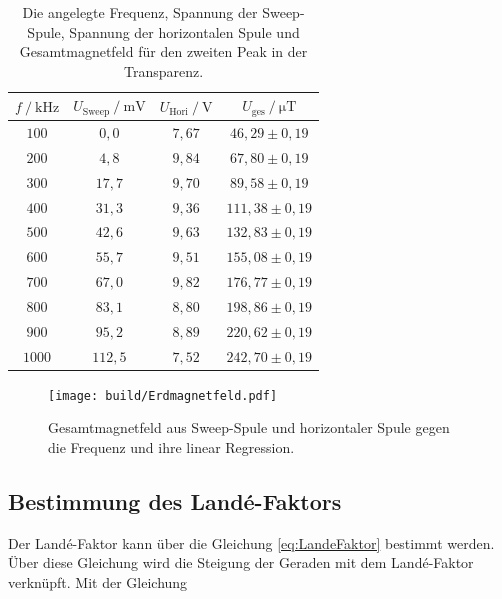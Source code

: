 \begin{table}[H]
    \centering
    \caption{Die angelegte Frequenz, Spannung der Sweep-Spule, Spannung der horizontalen Spule und Gesamtmagnetfeld für den zweiten Peak in der Transparenz.}
    \label{tab:Messung2}
    \begin{tabular}{c c c c}
    \toprule
      $ f \mathbin{/} \unit{\kilo\hertz}$ & $U_{\text{Sweep}} \mathbin{/} \unit{\milli\volt}$ & $U_{\text{Hori}} \mathbin{/} \unit{\volt}$ & $U_{\text{ges}} \mathbin{/} \unit{\micro\tesla}$ \\
    \midrule
        $100$ &     $ 0,0    $    &   $7,67$     &$46,29   \pm 0,19$     \\ 
        $200$ &     $ 4,8  $    &   $9,84$     &$67,80   \pm 0,19$     \\ 
        $300$ &     $ 17,7 $    &   $9,70$     &$89,58   \pm 0,19$    \\ 
        $400$ &     $ 31,3 $    &   $9,36$     &$111,38  \pm 0,19$    \\ 
        $500$ &     $ 42,6 $    &   $9,63$     &$132,83  \pm 0,19$    \\ 
        $600$ &     $ 55,7 $    &   $9,51$     &$155,08  \pm 0,19$    \\ 
        $700$ &     $ 67,0 $    &   $9,82$     &$176,77  \pm 0,19$    \\ 
        $800$ &     $ 83,1 $    &   $8,80$     &$198,86  \pm 0,19$    \\ 
        $900$ &     $ 95,2 $    &   $8,89$     &$220,62  \pm 0,19$    \\ 
        $1000$ &    $ 112,5$    &   $7,52$     &$242,70  \pm 0,19$    \\ 
    \bottomrule
    \end{tabular}
    \end{table}


\begin{figure}[H]
    \centering
    \texttt{[image: build/Erdmagnetfeld.pdf]}
    \caption{Gesamtmagnetfeld aus Sweep-Spule und horizontaler Spule gegen die Frequenz und ihre linear Regression.}
    \label{fig:Gesamtmagnetfeld}
\end{figure}

\subsection{Bestimmung des Landé-Faktors}

Der Landé-Faktor kann über die Gleichung \eqref{eq:LandeFaktor} bestimmt werden.
Über diese Gleichung wird die Steigung der Geraden mit dem Landé-Faktor verknüpft.
Mit der Gleichung

